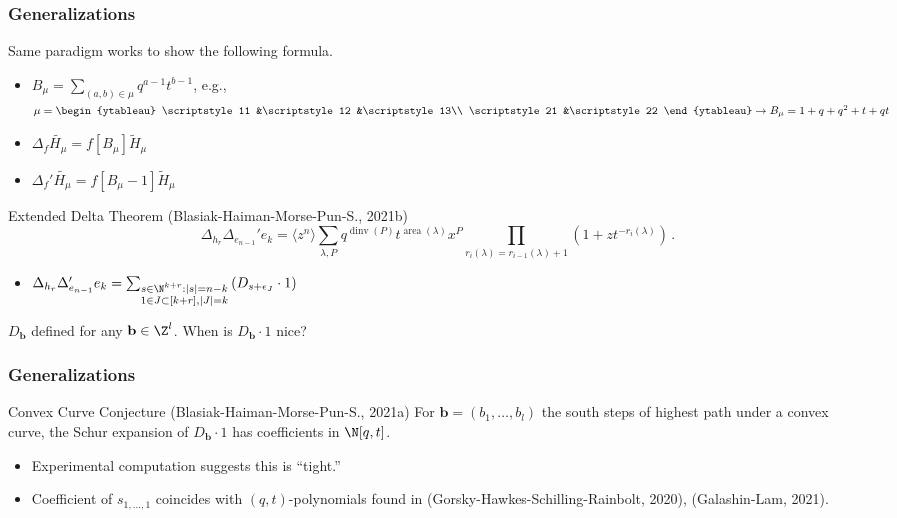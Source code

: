 \documentclass{beamer}
\DeclareMathOperator{\area}{area}
\DeclareMathOperator{\dinv}{dinv}
\newcommand{\bb}{{\mathbf b}}
\newcounter{c}
\begin{document}
\begin{frame}
  \frametitle{Generalizations}
  Same paradigm works to show the following formula.\pause
  \begin{itemize}
  \item \(B_\mu = \sum_{(a,b) \in \mu} q^{a-1} t^{b-1}\), e.g., \(\mu
    =
    \begin{ytableau}
      \scriptstyle 11 &\scriptstyle  12 &\scriptstyle  13\\
      \scriptstyle 21 &\scriptstyle  22 
    \end{ytableau}
    \to B_\mu = 1 + q + q^2 + t + qt\)\pause
  \item \(\Delta_f \tilde{H_\mu} = f[B_\mu] \tilde{H}_\mu\)\pause
  \item \(\Delta_f' \tilde{H_\mu} = f[B_\mu-1] \tilde{H}_\mu\)\pause
  \end{itemize}
  \begin{block}{Extended Delta Theorem (Blasiak-Haiman-Morse-Pun-S.,
      2021b)}
    \[\Delta_{h_r} \Delta_{e_{n-1}}' e_k
      = \langle z^n \rangle \sum_{\lambda,P} q^{\dinv(P)}
      t^{\area(\lambda)} x^P \prod_{r_i(\lambda)=r_{i-1}(\lambda)+1}
      (1+zt^{-r_i(\lambda)})\,.\]
  \end{block}\pause
  \begin{itemize}
  \item \(\Delta_{h_r}\Delta_{e_{n-1}}' e_k =  \sum_{\substack{s \in
        \N^{k+r} : |s| = n-k \\ 1 \in J \subset [k+r], |J|=k}}\left( D_{s +
      \epsilon_J} \cdot 1 \right)\)
  \end{itemize}
\end{frame}
\begin{frame}
  \(D_\bb\) defined for any \(\bb \in \Z^l\). When is \(D_\bb \cdot
  1\) nice?\pause
  \frametitle{Generalizations}
    \pause
  \begin{block}{Convex Curve Conjecture (Blasiak-Haiman-Morse-Pun-S., 2021a)}
    For \(\bb = (b_1,\ldots,b_l)\) the south steps of highest path
    under a convex curve, the Schur expansion of
    \(D_{\bb} \cdot 1\) has coefficients in \(\N[q,t]\).
  \end{block}\pause
  \begin{itemize}
  \item Experimental computation suggests this is ``tight.''\pause
  \item Coefficient of \(s_{1,\ldots,1}\) coincides with \((q,t)\)-polynomials
    found in (Gorsky-Hawkes-Schilling-Rainbolt, 2020),
    (Galashin-Lam, 2021).
  \end{itemize}
\end{frame}
\end{document}
